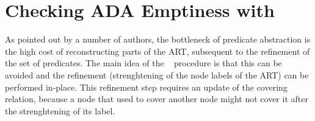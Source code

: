 \documentclass[10pt,conference,letterpaper,twocolumn]{IEEEtran}
\begin{document}
\section{Checking ADA Emptiness with \impact}

As pointed out by a number of authors, the bottleneck of predicate
abstraction is the high cost of reconstructing parts of the ART,
subsequent to the refinement of the set of predicates. The main idea
of the \impact~ procedure \cite{mcmillan06} is that this can be
avoided and the refinement (strenghtening of the node labels of the
ART) can be performed in-place. This refinement step requires an
update of the covering relation, because a node that used to cover
another node might not cover it after the strenghtening of its label.

\end{document}
